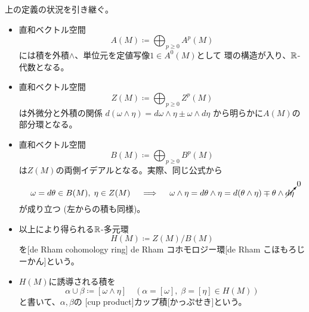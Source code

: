 \documentclass[report]{jlreq}
\begin{document}
\begin{definition}
    上の定義の状況を引き継ぐ。
    \begin{itemize}
        \item 直和ベクトル空間
            \begin{equation}
                A(M) \coloneqq \bigoplus_{p \ge 0} A^p(M)
            \end{equation}
            には積を外積$\wedge$、単位元を定値写像$1 \in A^0(M)$として
            環の構造が入り、$\mathbb{R}$-代数となる。
        \item 直和ベクトル空間
            \begin{equation}
                Z(M) \coloneqq \bigoplus_{p \ge 0} Z^p(M)
            \end{equation}
            は外微分と外積の関係
            $d(\omega \wedge \eta) = d\omega \wedge \eta \pm \omega \wedge d\eta$
            から明らかに$A(M)$の部分環となる。
        \item 直和ベクトル空間
            \begin{equation}
                B(M) \coloneqq \bigoplus_{p \ge 0} B^p(M)
            \end{equation}
            は$Z(M)$の両側イデアルとなる。実際、同じ公式から
            \begin{equation}
                \omega = d\theta \in B(M), \; \eta \in Z(M)
                \quad \implies \quad
                \omega \wedge \eta
                    = d\theta \wedge \eta
                    = d(\theta \wedge \eta) \mp \theta \wedge \cancelto{0}{d\eta}
            \end{equation}
            が成り立つ (左からの積も同様)。
        \item 以上により得られる$\mathbb{R}$-多元環
            \begin{equation}
                H(M) \coloneqq Z(M) / B(M)
            \end{equation}
            を[de Rham cohomology ring]
            {de Rham コホモロジー環}[de Rham こほもろじーかん]という。
        \item $H(M)$に誘導される積を
            \begin{equation}
                \alpha \cup \beta \coloneqq [\omega \wedge \eta]
                    \quad
                    (\alpha = [\omega], \; \beta = [\eta] \in H(M))
            \end{equation}
            と書いて、$\alpha, \beta$の
            [cup product]{カップ積}[かっぷせき]という。
    \end{itemize}
\end{definition}
\end{document}
